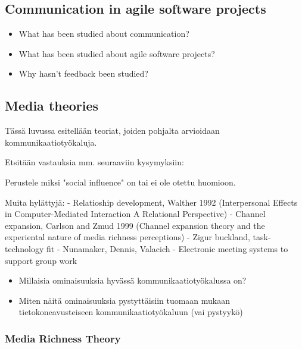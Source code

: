 \documentclass[english,12pt,a4paper,pdftex]{article}
\begin{document}
\subsection{Communication in agile software projects}

\begin{itemize}
\item What has been studied about communication?
\item What has been studied about agile software projects?
\item Why hasn't feedback been studied?
\end{itemize}

\subsection{Media theories}

Tässä luvussa esitellään teoriat, joiden pohjalta arvioidaan kommunikaatiotyökaluja.

Etsitään vastauksia mm. seuraaviin kysymyksiin:

Perustele miksi "social influence" on tai ei ole otettu huomioon.

Muita hylättyjä: 
- Relatioship development, Walther 1992 (Interpersonal Effects in Computer-Mediated Interaction A Relational Perspective)
- Channel expansion, Carlson and Zmud 1999 (Channel expansion theory and the experiental nature of media richness perceptions)
- Zigur buckland, task-technology fit
- Nunamaker, Dennis, Valacich - Electronic meeting systems to support group work

\begin{itemize}
\item Millaisia ominaisuuksia hyvässä kommunikaatiotyökalussa on?
\item Miten näitä ominaisuuksia pystyttäisiin tuomaan mukaan tietokoneavusteiseen kommunikaatiotyökaluun (vai pystyykö)
\end{itemize}

\subsubsection{Media Richness Theory}

\end{document}
